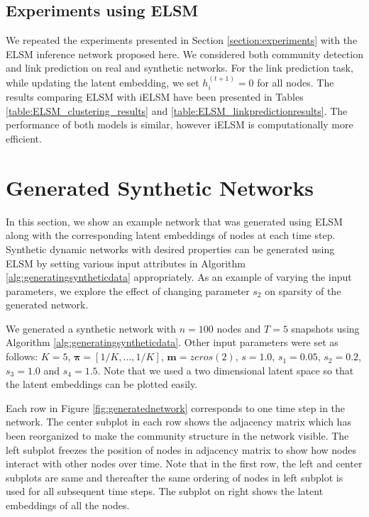 \documentclass[letterpaper]{article} %
\begin{document}
\subsection{Experiments using ELSM}
\label{appendix:experiemtnsusingELSM}
We repeated the experiments presented in Section \ref{section:experiments} with the ELSM inference network proposed here. We considered both community detection and link prediction on real and synthetic networks. For the link prediction task, while updating the latent embedding, we set $h_i^{(t+1)} = 0$ for all nodes. The results comparing ELSM with iELSM have been presented in Tables \ref{table:ELSM_clustering_results} and \ref{table:ELSM_linkpredictionresults}. The performance of both models is similar, however iELSM is computationally more efficient.
\fi


\section{Generated Synthetic Networks}
\label{appendix:generatedsyntheticnetworks}

In this section, we show an example network that was generated using ELSM along with the corresponding latent embeddings of nodes at each time step. Synthetic dynamic networks with desired properties can be generated using ELSM by setting various input attributes in Algorithm \ref{alg:generatingsyntheticdata} appropriately. As an example of varying the input parameters, we explore the effect of changing parameter $s_2$ on sparsity of the generated network.

We generated a synthetic network with $n=100$ nodes and $T=5$ snapshots using Algorithm \ref{alg:generatingsyntheticdata}. Other input parameters were set as follows: $K=5$, $\mathbf{\pi}=[1/K, ..., 1/K]$, $\mathbf{m}=zeros(2)$, $s=1.0$, $s_1=0.05$, $s_2=0.2$, $s_3=1.0$ and $s_4=1.5$. Note that we used a two dimensional latent space so that the latent embeddings can be plotted easily.

Each row in Figure \ref{fig:generatednetwork} corresponds to one time step in the network. The center subplot in each row shows the adjacency matrix which has been reorganized to make the community structure in the network visible. The left subplot freezes the position of nodes in adjacency matrix to show how nodes interact with other nodes over time. Note that in the first row, the left and center subplots are same and thereafter the same ordering of nodes in left subplot is used for all subsequent time steps. The subplot on right shows the latent embeddings of all the nodes.
\end{document}
